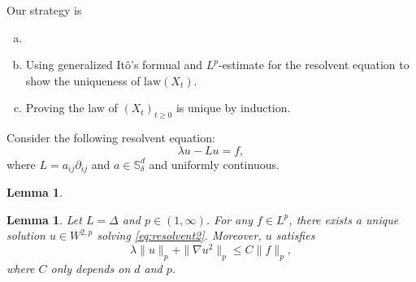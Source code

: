 \documentclass[twoside, 12pt]{book}
\numberwithin{equation}{chapter}
\newtheorem{lemma}[theorem]{Lemma}
\def\mS{{\mathbb S}}
\def\geq{\geqslant}
\def\leq{\leqslant}
\def\p{\partial}
\begin{document}
	Our strategy is 
	\begin{enumerate}[(a)]
		\item %
		\item Using generalized It\^o's formual and $L^p$-estimate for the  resolvent equation to show the uniqueness of $\mathrm{law} (X_t)$. 
		\item  Proving the law of $(X_t)_{t\geq 0}$ is unique  by induction. 
	\end{enumerate}
	
	
	Consider the following resolvent equation: 
	\begin{equation}\label{eq:resolvent2}
		\lambda u - L u =f,  
	\end{equation}
	where $L=a_{ij}\p_{ij}$ and $a\in \mS_\delta^d$ and uniformly continuous. 
	
	\begin{lemma}
		
	\end{lemma}
    
    \begin{lemma}\label{lem:laplace-lp}
		Let $L=\Delta$ and $p\in (1,\infty)$. For any $f\in L^p$, there exists a unique solution $u\in W^{2,p}$ solving \eqref{eq:resolvent2}. Moreover, $u$ satisfies  
		\begin{equation}
			\lambda \|u\|_p+\|\nabla u^2\|_{p}\leq C \|f\|_p,  
		\end{equation}
		where $C$ only depends on $d$ and $p$.  
	\end{lemma}
	
\end{document}
